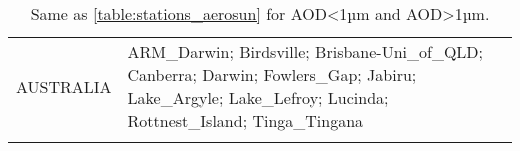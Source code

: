 \begin{table}
\begin{tabularx}{\textwidth}{lX}
  AUSTRALIA & ARM\_Darwin; Birdsville; Brisbane-Uni\_of\_QLD; Canberra; Darwin; Fowlers\_Gap; Jabiru; Lake\_Argyle; Lake\_Lefroy; Lucinda; Rottnest\_Island; Tinga\_Tingana                                                                                                                                                                                                                                                                                                                                                                                                                                                                                                                                                                                                                                                                                                                                                                                                                                                                                                                                                                                                                                                                                                                                                                                                                                                                                                                                                                                           \\
  \bottomhline
 \end{tabularx}
 \caption{Same as \ref{table:stations_aerosun} for AOD<1µm and AOD>1µm.}
 \label{table:stations_aerosda}
\end{table}

\clearpage

